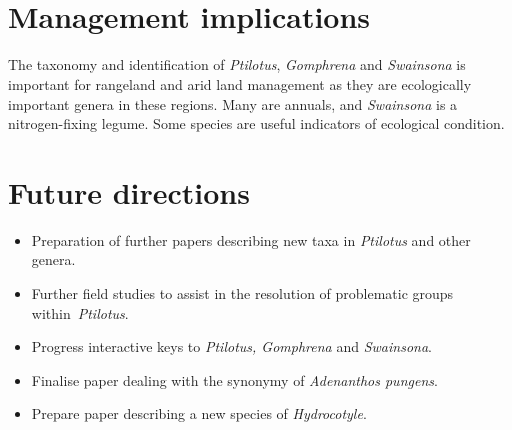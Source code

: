 \documentclass[version=last,
    paper=a4, %
    10pt, %
    usenames,
    dvipsnames,
    oneside, %
    headings=openany, %
    DIV=15 %
]{scrbook}
\begin{document}
~

~~



\section*{Management implications}
The taxonomy and identification of \emph{Ptilotus}, \emph{Gomphrena} and
\emph{Swainsona} is important for rangeland and arid land management as
they are ecologically important genera in these regions. Many are
annuals, and \emph{Swainsona} is a nitrogen-fixing legume. Some species
are useful indicators of ecological condition.



\section*{Future directions}
\begin{itemize}
\itemsep1pt\parskip0pt
\item
  Preparation of further papers describing new taxa in \emph{Ptilotus}
  and other genera.
\item
  Further field studies to assist in the resolution of problematic
  groups within~\emph{Ptilotus}.
\item
  Progress interactive keys to \emph{Ptilotus, Gomphrena} and
  \emph{Swainsona}.
\item
  Finalise paper dealing with the synonymy of \emph{Adenanthos pungens}.
\item
  Prepare paper describing a new species of \emph{Hydrocotyle}.
\end{itemize}



\end{document}
